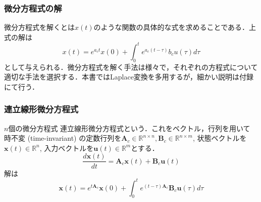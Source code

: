 \subsubsection{微分方程式の解}
微分方程式を解くとは$x(t)$のような関数の具体的な式を求めることである．上式の解は
\begin{equation}
x(t)=e^{a_c t}x(0)+\int_0^t e^{a_c (t-\tau)}b_c u(\tau) d\tau
\end{equation}
として与えられる．微分方程式を解く手法は様々で，それぞれの方程式について適切な手法を選択する．本書ではLaplace変換を多用するが，細かい説明は付録にて行う．
\subsubsection{連立線形微分方程式}
$n$個の微分方程式
連立線形微分方程式という．これをベクトル，行列を用いて
時不変 (time-invariant) の定数行列を$\mathbf{A}_c \in \mathbb{R}^{n\times n}, \mathbf{B}_c \in \mathbb{R}^{n\times m}$, 状態ベクトルを$\mathbf{x}(t)\in\mathbb{R}^n$, 入力ベクトルを$\mathbf{u}(t)\in\mathbb{R}^m$とする．
\begin{equation}
\frac{d\mathbf{x}(t)}{dt} = \mathbf{A}_c\mathbf{x}(t) + \mathbf{B}_c\mathbf{u}(t)
\end{equation}
解は
\begin{equation}
\mathbf{x}(t)=e^{t\mathbf{A}_c}\mathbf{x}(0)+\int_0^t e^{(t-\tau)\mathbf{A}_c}\mathbf{B}_c\mathbf{u}(\tau) d\tau
\end{equation}
